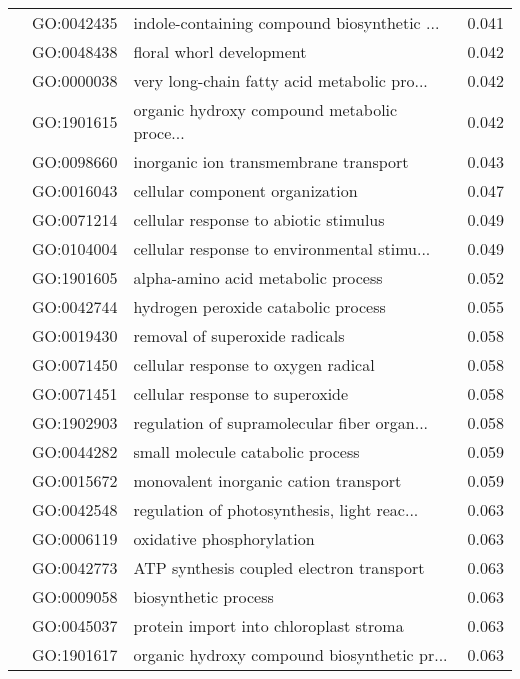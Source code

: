 \begin{longtable}{lllr}
   & GO:0042435 &  indole-containing compound biosynthetic ... &         0.041 \\
   & GO:0048438 &                     floral whorl development &         0.042 \\
   & GO:0000038 &  very long-chain fatty acid metabolic pro... &         0.042 \\
   & GO:1901615 &  organic hydroxy compound metabolic proce... &         0.042 \\
   & GO:0098660 &        inorganic ion transmembrane transport &         0.043 \\
   & GO:0016043 &              cellular component organization &         0.047 \\
   & GO:0071214 &        cellular response to abiotic stimulus &         0.049 \\
   & GO:0104004 &  cellular response to environmental stimu... &         0.049 \\
   & GO:1901605 &           alpha-amino acid metabolic process &         0.052 \\
   & GO:0042744 &          hydrogen peroxide catabolic process &         0.055 \\
   & GO:0019430 &               removal of superoxide radicals &         0.058 \\
   & GO:0071450 &          cellular response to oxygen radical &         0.058 \\
   & GO:0071451 &              cellular response to superoxide &         0.058 \\
   & GO:1902903 &  regulation of supramolecular fiber organ... &         0.058 \\
   & GO:0044282 &             small molecule catabolic process &         0.059 \\
   & GO:0015672 &        monovalent inorganic cation transport &         0.059 \\
   & GO:0042548 &  regulation of photosynthesis, light reac... &         0.063 \\
   & GO:0006119 &                    oxidative phosphorylation &         0.063 \\
   & GO:0042773 &     ATP synthesis coupled electron transport &         0.063 \\
   & GO:0009058 &                         biosynthetic process &         0.063 \\
   & GO:0045037 &       protein import into chloroplast stroma &         0.063 \\
   & GO:1901617 &  organic hydroxy compound biosynthetic pr... &         0.063 \\

\end{longtable}
